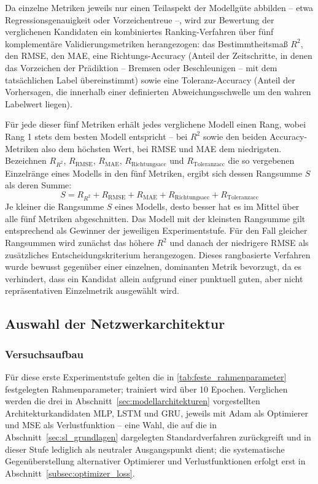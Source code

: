 Da einzelne Metriken jeweils nur einen Teilaspekt der Modellgüte abbilden -- etwa Regressionsgenauigkeit oder Vorzeichentreue --, wird zur Bewertung der verglichenen Kandidaten ein kombiniertes Ranking-Verfahren über fünf komplementäre Validierungsmetriken herangezogen: das Bestimmtheitsmaß $R^2$, den \gls{RMSE}, den \gls{MAE}, eine Richtungs-Accuracy (Anteil der Zeitschritte, in denen das Vorzeichen der Prädiktion -- Bremsen oder Beschleunigen -- mit dem tatsächlichen Label übereinstimmt) sowie eine Toleranz-Accuracy (Anteil der Vorhersagen, die innerhalb einer definierten Abweichungsschwelle um den wahren Labelwert liegen).

Für jede dieser fünf Metriken erhält jedes verglichene Modell einen Rang, wobei Rang 1 stets dem besten Modell entspricht -- bei $R^2$ sowie den beiden Accuracy-Metriken also dem höchsten Wert, bei \gls{RMSE} und \gls{MAE} dem niedrigsten. Bezeichnen $R_{R^2}$, $R_{\text{RMSE}}$, $R_{\text{MAE}}$, $R_{\text{Richtungsacc}}$ und $R_{\text{Toleranzacc}}$ die so vergebenen Einzelränge eines Modells in den fünf Metriken, ergibt sich dessen Rangsumme $S$ als deren Summe:
\begin{equation}
    S = R_{R^2} + R_{\text{RMSE}} + R_{\text{MAE}} + R_{\text{Richtungsacc}} + R_{\text{Toleranzacc}}
    \label{eq:rangsumme}
\end{equation}
Je kleiner die Rangsumme $S$ eines Modells, desto besser hat es im Mittel über alle fünf Metriken abgeschnitten. Das Modell mit der kleinsten Rangsumme gilt entsprechend als Gewinner der jeweiligen Experimentstufe. Für den Fall gleicher Rangsummen wird zunächst das höhere $R^2$ und danach der niedrigere \gls{RMSE} als zusätzliches Entscheidungskriterium herangezogen. Dieses rangbasierte Verfahren wurde bewusst gegenüber einer einzelnen, dominanten Metrik bevorzugt, da es verhindert, dass ein Kandidat allein aufgrund einer punktuell guten, aber nicht repräsentativen Einzelmetrik ausgewählt wird.

\subsection{Auswahl der Netzwerkarchitektur}
\label{subsec:architekturauswahl}

\subsubsection{Versuchsaufbau}
\label{subsubsec:architektur_versuchsaufbau}

Für diese erste Experimentstufe gelten die in \autoref{tab:feste_rahmenparameter} festgelegten Rahmenparameter; trainiert wird über 10 Epochen. Verglichen werden die drei in Abschnitt~\ref{sec:modellarchitekturen} vorgestellten Architekturkandidaten \gls{MLP}, \gls{LSTM} und \gls{GRU}, jeweils mit \gls{Adam} als Optimierer und \gls{MSE} als Verlustfunktion -- eine Wahl, die auf die in Abschnitt~\ref{sec:sl_grundlagen} dargelegten Standardverfahren zurückgreift und in dieser Stufe lediglich als neutraler Ausgangspunkt dient; die systematische Gegenüberstellung alternativer Optimierer und Verlustfunktionen erfolgt erst in Abschnitt~\ref{subsec:optimizer_loss}.

